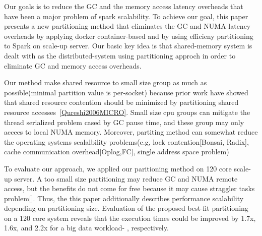 \fi


\ifkor
Our goals is to reduce the GC and the memory access latency overheads that
have been a major problem of spark scalability.
To achieve our goal, this paper presents a new partitioning method that
eliminates the GC and NUMA latency overheads by applying docker
container-based and by using efficieny partitioning to Spark on scale-up server.
Our basic key idea is that shared-memory system is dealt with as the
distributed-system using partitioning approch in order to eliminate GC and
memory access overheads.

Our method make shared resource to small size group as much as
possible(minimal partition value is per-socket) because prior work have showed
that shared resource contention should be minimized by partitioning shared
resource accesses~\ref{Qureshi2006MICRO}.
Small size cpu groups can mitigate the thread serialized problem cased by GC
pause time, and these group may only accees to local NUMA memory.
Moreover, partiting method can somewhat reduce the operating systems
scalalbility problems(e.g, lock contention[Bonsai, Radix], cache communication
overhead[Oplog,FC], single address space problem)
\else

\fi

\ifkor
To evaluate our approach, we applied our paritioning method on 120 core
scale-up server.
A too small size partitioning may reduce GC and NUMA remote access, but the
benefits do not come for free because it may cause straggler tasks problem[].
Thus, the this paper additionally describes performance scalability
depending on partitioning size.
Evaluation of the proposed best-fit partitioning on a 120 core system
 reveals that the execution times could be improved by 1.7x, 1.6x, and 2.2x for
a big data workload- , respectively.
\else


